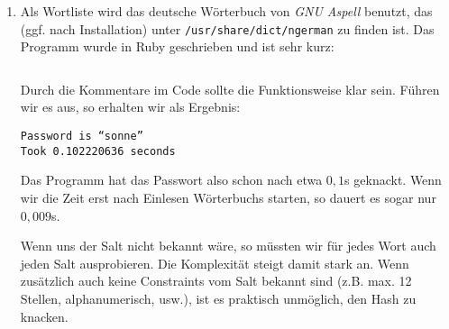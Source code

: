 \documentclass[a4paper,11pt]{scrartcl}
\begin{document}
\begin{enumerate}[1.]
    \item
        Als Wortliste wird das deutsche Wörterbuch von \textit{GNU Aspell}
        benutzt, das (ggf. nach Installation) unter
        \texttt{/usr/share/dict/ngerman} zu finden ist. Das Programm wurde in
        Ruby geschrieben und ist sehr kurz:

        \inputminted[linenos,numbersep=12pt,autogobble,frame=lines,framesep=2mm]%
                    {ruby}{pwcrack.rb}

        Durch die Kommentare im Code sollte die Funktionsweise klar sein. Führen
        wir es aus, so erhalten wir als Ergebnis:

        \texttt{Password is ``sonne''}\\
        \texttt{Took 0.102220636 seconds}

        Das Programm hat das Passwort also schon nach etwa $0,1$s geknackt. Wenn
        wir die Zeit erst nach Einlesen Wörterbuchs starten, so dauert es sogar
        nur $0,009$s.

        Wenn uns der Salt nicht bekannt wäre, so müssten wir für jedes Wort auch
        jeden Salt ausprobieren. Die Komplexität steigt damit stark an. Wenn
        zusätzlich auch keine Constraints vom Salt bekannt sind (z.B. max. 12
        Stellen, alphanumerisch, usw.), ist es praktisch unmöglich, den Hash zu
        knacken.
\end{enumerate}
\end{document}
